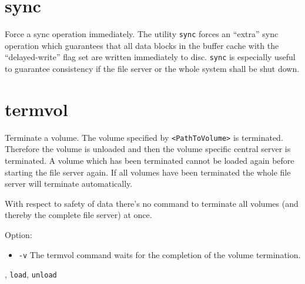 \section{sync}
\begin{man}
  \PP Force a sync operation immediately.
  \DE The utility {\tt sync} forces an ``extra'' sync operation which guarantees
             that all data blocks in the buffer cache with the ``delayed-write''
             flag set are written immediately to disc. {\tt sync} is especially
             useful to guarantee consistency if the file server or the whole
             system shall be shut down.
\end{man}

\section{termvol}
\begin{man}
  \PP Terminate a volume.
  \DE The volume specified by {\tt <PathToVolume>} is terminated.
             Therefore the volume is unloaded and then the volume specific
             central server is terminated. A volume which has been terminated 
             cannot be loaded again before starting the file server again. If 
             all volumes have been terminated the whole file server will 
             terminate automatically.
             \begin{note}
               With respect to safety of data there's no command to terminate
               all volumes (and thereby the complete file server) at once.
             \end{note}

             Option:

             \begin{itemize}
             \item {\tt -v}\newline
               The termvol command waits for the completion of the volume
               termination.
             \end{itemize}

  , {\tt load}, {\tt unload}
\end{man}

